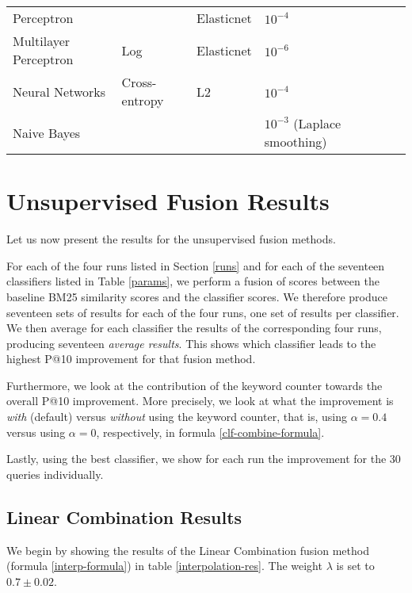 \begin{table}[h!]
{\begin{tabular}{@{}llllll@{}}
Perceptron                      &			& Elasticnet             & $10^{-4}$                                            &  &  \\
Multilayer Perceptron          & Log			& Elasticnet       & $10^{-6}$                                                        &  &  \\
Neural Networks                 & Cross-entropy		& L2               & $10^{-4}$ &  &  \\ 
Naive Bayes                    	& 			 &              & $10^{-3}$ (Laplace smoothing)                            &  &  \\\bottomrule
\end{tabular}%
}
\end{table}

\section{Unsupervised Fusion Results}
Let us now present the results for the unsupervised fusion methods. 

For each of the four runs listed in Section \ref{runs} and for each of the seventeen classifiers listed in Table \ref{params}, we perform a fusion of scores
between the baseline BM25 similarity scores and the classifier scores. 
We therefore produce seventeen sets of results for each of the four runs,
one set of results per classifier.
We then average for each classifier the results of the corresponding four runs, producing seventeen \emph{average results}.
This shows which classifier leads to the highest P@10 improvement for that fusion method.

Furthermore, we look at the contribution of the keyword counter towards the overall P@10 improvement. More precisely,
we look at what the improvement is \emph{with} (default) versus \emph{without} using the keyword counter, that is, using $\alpha=0.4$
versus using $\alpha=0$, respectively, in formula \ref{clf-combine-formula}.

Lastly, using the best classifier, we show for each run the improvement for the 30 queries individually.

\subsection{Linear Combination Results}
We begin by showing the results of the Linear Combination fusion method (formula \ref{interp-formula}) in table \ref{interpolation-res}.
The weight $\lambda$ is set to $0.7\pm 0.02$.

